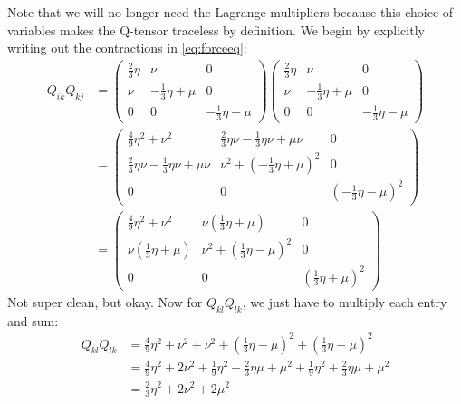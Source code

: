 \documentclass[reqno]{article}
\begin{document}
	Note that we will no longer need the Lagrange multipliers because this choice of variables makes the Q-tensor traceless by definition. We begin by explicitly writing out the contractions in \eqref{eq:forceeq}:
	\begin{equation}
	\begin{split}
		Q_{ik}Q_{kj} &= 
		\begin{pmatrix}
		\frac{2}{3} \eta & \nu & 0\\
		\nu & -\frac{1}{3}\eta + \mu & 0 \\
		0 & 0 & -\frac{1}{3}\eta - \mu
		\end{pmatrix}
		\begin{pmatrix}
		\frac{2}{3} \eta & \nu & 0\\
		\nu & -\frac{1}{3}\eta + \mu & 0 \\
		0 & 0 & -\frac{1}{3}\eta - \mu
		\end{pmatrix} \\
		&=
		\begin{pmatrix}
			\frac{4}{9} \eta^2 + \nu^2 & \frac{2}{3}\eta\nu - \frac{1}{3}\eta\nu + \mu\nu & 0 \\
			\frac{2}{3}\eta\nu -\frac{1}{3}\eta\nu + \mu\nu & \nu^2 + \left( -\frac{1}{3}\eta + \mu \right)^2 & 0 \\
			0 & 0 & \left( -\frac{1}{3}\eta - \mu \right)^2
		\end{pmatrix} \\
		&= \begin{pmatrix}
			\frac{4}{9}\eta^2 + \nu^2 & \nu\left( \frac{1}{3}\eta + \mu \right) & 0 \\
			\nu\left( \frac{1}{3}\eta + \mu \right) & \nu^2 + \left( \frac{1}{3}\eta - \mu \right)^2 & 0 \\
			0 & 0 & \left( \frac{1}{3}\eta + \mu \right)^2
		\end{pmatrix}
	\end{split}
	\end{equation}
	Not super clean, but okay. Now for $Q_{kl}Q_{lk}$, we just have to multiply each entry and sum:
	\begin{equation} \label{eq:fullcontrac}
	\begin{split}
		Q_{kl}Q_{lk} &= \frac{4}{9}\eta^2 + \nu^2 + \nu^2 + \left( \frac{1}{3}\eta - \mu \right)^2 + \left( \frac{1}{3}\eta + \mu \right)^2 \\
		&= \frac{4}{9}\eta^2 + 2\nu^2 + \frac{1}{9}\eta^2 - \frac{2}{3}\eta\mu + \mu^2 + \frac{1}{9}\eta^2 + \frac{2}{3}\eta\mu + \mu^2 \\
		&= \frac{2}{3}\eta^2 + 2\nu^2 + 2\mu^2
	\end{split}
	\end{equation}
	
\end{document}
